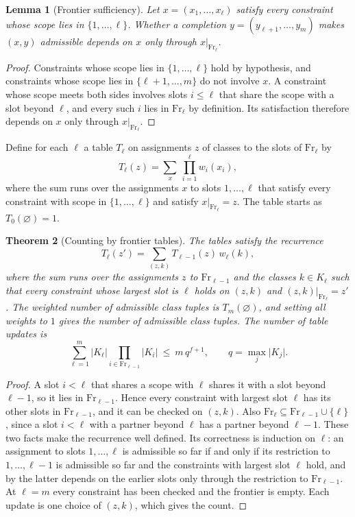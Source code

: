\documentclass[11pt,twoside,openright]{book}
\theoremstyle{plain}
\newtheorem{theorem}{Theorem}[chapter]
\newtheorem{lemma}[theorem]{Lemma}
\theoremstyle{definition}
\theoremstyle{remark}
\newcommand{\Fr}{\mathrm{Fr}}
\begin{document}
\begin{lemma}[Frontier sufficiency]\label{lem:suff}
Let $x=(x_1,\dots,x_\ell)$ satisfy every constraint whose scope lies in $\{1,\dots,\ell\}$. Whether a completion $y=(y_{\ell+1},\dots,y_m)$ makes $(x,y)$ admissible depends on $x$ only through $x|_{\Fr_\ell}$.
\end{lemma}

\begin{proof}
Constraints whose scope lies in $\{1,\dots,\ell\}$ hold by hypothesis, and constraints whose scope lies in $\{\ell+1,\dots,m\}$ do not involve $x$. A constraint whose scope meets both sides involves slots $i\le\ell$ that share the scope with a slot beyond $\ell$, and every such $i$ lies in $\Fr_\ell$ by definition. Its satisfaction therefore depends on $x$ only through $x|_{\Fr_\ell}$.
\end{proof}

Define for each $\ell$ a table $T_\ell$ on assignments $z$ of classes to the slots of $\Fr_\ell$ by
\[
T_\ell(z)=\sum_{x}\ \prod_{i=1}^{\ell}w_i(x_i),
\]
where the sum runs over the assignments $x$ to slots $1,\dots,\ell$ that satisfy every constraint with scope in $\{1,\dots,\ell\}$ and satisfy $x|_{\Fr_\ell}=z$. The table starts as $T_0(\varnothing)=1$.

\begin{theorem}[Counting by frontier tables]\label{thm:frontier}
The tables satisfy the recurrence
\[
T_\ell(z')=\sum_{(z,k)}T_{\ell-1}(z)\,w_\ell(k),
\]
where the sum runs over the assignments $z$ to $\Fr_{\ell-1}$ and the classes $k\in K_\ell$ such that every constraint whose largest slot is $\ell$ holds on $(z,k)$ and $(z,k)|_{\Fr_\ell}=z'$. The weighted number of admissible class tuples is $T_m(\varnothing)$, and setting all weights to $1$ gives the number of admissible class tuples. The number of table updates is
\[
\sum_{\ell=1}^m\lvert K_\ell\rvert\prod_{i\in\Fr_{\ell-1}}\lvert K_i\rvert\ \le\ m\,q^{f+1},\qquad q=\max_j\lvert K_j\rvert .
\]
\end{theorem}

\begin{proof}
A slot $i<\ell$ that shares a scope with $\ell$ shares it with a slot beyond $\ell-1$, so it lies in $\Fr_{\ell-1}$. Hence every constraint with largest slot $\ell$ has its other slots in $\Fr_{\ell-1}$, and it can be checked on $(z,k)$. Also $\Fr_\ell\subseteq\Fr_{\ell-1}\cup\{\ell\}$, since a slot $i<\ell$ with a partner beyond $\ell$ has a partner beyond $\ell-1$. These two facts make the recurrence well defined. Its correctness is induction on $\ell$: an assignment to slots $1,\dots,\ell$ is admissible so far if and only if its restriction to $1,\dots,\ell-1$ is admissible so far and the constraints with largest slot $\ell$ hold, and by  the latter depends on the earlier slots only through the restriction to $\Fr_{\ell-1}$. At $\ell=m$ every constraint has been checked and the frontier is empty. Each update is one choice of $(z,k)$, which gives the count.
\end{proof}
\end{document}
